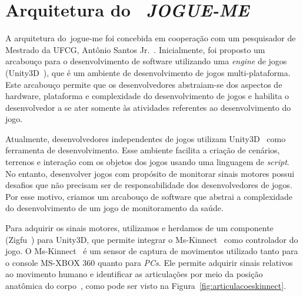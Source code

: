 \section{Arquitetura do ~\textit{JOGUE-ME}}\label{sec:cliente_game}
A arquitetura do~\ac{jogue-me} foi concebida em cooperação com um pesquisador de Mestrado da UFCG, Antônio Santos Jr.~\cite{antonio2013}. Inicialmente, foi proposto um arcabouço para o desenvolvimento de software utilizando uma \textit{engine} de jogos (Unity3D~\cite{unity3d}), que é um ambiente de desenvolvimento de jogos multi-plataforma. Este arcabouço permite que os desenvolvedores abstraiam-se dos aspectos de hardware, plataforma e complexidade do desenvolvimento de jogos e habilita o desenvolvedor a se ater somente às atividades referentes ao desenvolvimento do jogo.

Atualmente, desenvolvedores independentes de jogos utilizam Unity3D~\cite{unity3d} como ferramenta de desenvolvimento. Esse ambiente facilita a criação de cenários, terrenos e interação com os objetos dos jogos usando uma linguagem de \textit{script}. No entanto, desenvolver jogos com propósito de monitorar sinais motores possui desafios que não precisam ser de responsabilidade dos desenvolvedores de jogos. Por esse motivo, criamos um arcabouço de software que abstrai a complexidade do desenvolvimento de um jogo de monitoramento da saúde.


Para adquirir os sinais motores, utilizamos e herdamos de um componente (Zigfu~\cite{zigfu}) para Unity3D, que permite integrar o Ms-Kinnect~\cite{kinnect2013} como controlador do jogo. O Ms-Kinnect~\cite{kinnect2013} é um sensor de captura de movimentos utilizado tanto para o console MS-XBOX 360 quanto para \textit{PCs}. Ele permite adquirir sinais relativos ao movimento humano e identificar as articulações por meio da posição anatômica do corpo~\cite{hamill1999bases}, como pode ser visto na Figura~\ref{fig:articulacoeskinnect}.





